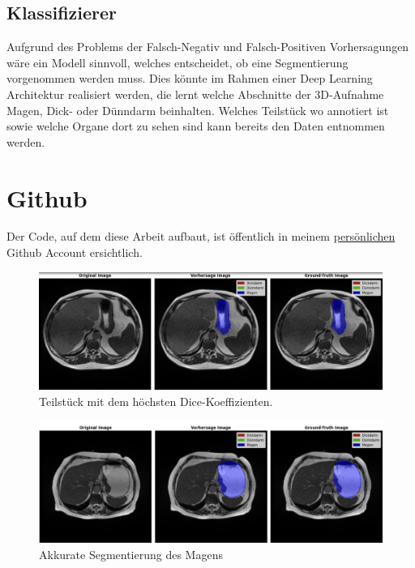 \subsection{Klassifizierer}

Aufgrund des Problems der Falsch-Negativ und Falsch-Positiven Vorhersagungen wäre ein Modell sinnvoll, welches entscheidet, ob eine Segmentierung vorgenommen werden muss. Dies könnte im Rahmen einer Deep Learning Architektur realisiert werden, die lernt welche Abschnitte der 3D-Aufnahme Magen, Dick- oder Dünndarm beinhalten. Welches Teilstück wo annotiert ist sowie welche Organe dort zu sehen sind kann bereits den Daten entnommen werden.

\section{Github}

Der Code, auf dem diese Arbeit aufbaut, ist öffentlich in meinem \href{https://github.com/vitoleonardo/HealthyOrganTracker/}{persönlichen} Github Account ersichtlich. 

\pagebreak

\begin{figure}[H]
	\begin{center}
		\includegraphics[width=400pt]{LaTex/bilder/case123_day20_slice_0073.png}
		\caption{ Teilstück mit dem höchsten Dice-Koeffizienten.}\label{Fig:case123_day20_slice_0073}
	\end{center}
\end{figure}


\begin{figure}[H]
	\begin{center}
		\includegraphics[width=400pt]{LaTex/bilder/case33_day21_slice_0086.png}
		\caption{ Akkurate Segmentierung des Magens }\label{Fig:case33_day21_slice_0086}
	\end{center}
\end{figure}

